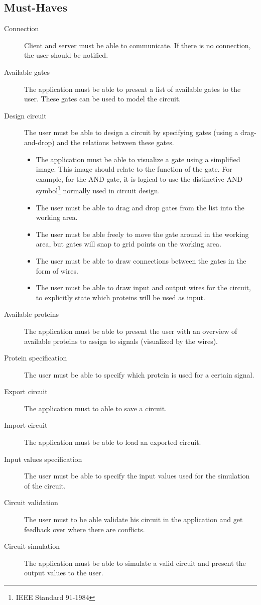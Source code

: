 \documentclass[a4paper]{article}
\begin{document}
\subsection{Must-Haves}
\begin{description}
\item[Connection] Client and server must be able to communicate. If there is no connection, the user should be notified.
\item[Available gates] The application must be able to present a list of available gates to the user. These gates can be used to model the circuit.
\item[Design circuit] The user must be able to design a circuit by specifying gates (using a drag-and-drop) and the relations between these gates.
	\begin{itemize}
	\item The application must be able to visualize a gate using a simplified image. This image should relate to the function of the gate. For example, for the AND gate, it is logical to use the distinctive AND symbol\footnote{IEEE Standard 91-1984} normally used in circuit design.
	\item The user must be able to drag and drop gates from the list into the working area.
	\item The user must be able freely to move the gate around in the working area, but gates will snap to grid points on the working area.
	\item The user must be able to draw connections between the gates in the form of wires.
	\item The user must be able to draw input and output wires for the circuit, to explicitly state which proteins will be used as input.
	\end{itemize}
\item[Available proteins] The application must be able to present the user with an overview of available proteins to assign to signals (visualized by the wires).
\item[Protein specification] The user must be able to specify which protein is used for a certain signal.
\item[Export circuit] The application must to able to save a circuit.
\item[Import circuit] The application must be able to load an exported circuit.
\item[Input values specification] The user must be able to specify the input values used for the simulation of the circuit.
\item[Circuit validation] The user must to be able validate his circuit in the application and get feedback over where there are conflicts.
\item[Circuit simulation] The application must be able to simulate a valid circuit and present the output values to the user.
\end{description}
\end{document}
